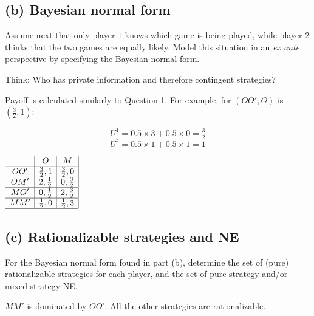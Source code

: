 \documentclass{article}
\begin{document}

\subsection*{(b) Bayesian normal form}

Assume next that only player $1$ knows which game is being played, while player $2$ thinks that
the two games are equally likely. Model this situation in an \textit{ex ante} perspective by specifying
the Bayesian normal form.

\smallskip

\begin{mdframed}[backgroundcolor=blue!20,linecolor=white]
Think: Who has private information and therefore contingent strategies?

\medskip

Payoff is calculated similarly to Question 1. For example, for $(OO',O)$ is $(\tfrac32,1)$:

$$U^1 = 0.5 \times 3 + 0.5 \times 0 = \tfrac32$$
$$U^2 = 0.5 \times 1 + 0.5 \times 1 = 1$$
\end{mdframed}


\begin{center}
$
\begin{array}{c|c|c|}
 & O & M \\
\hline
OO' & \tfrac32,1 & \tfrac32,0 \\
\hline
OM' & 2,\tfrac12 & 0,\tfrac32 \\
\hline
MO' & 0,\tfrac12 & 2,\tfrac32 \\
\hline
MM' & \tfrac12,0 & \tfrac12,3 \\
\hline
\end{array}
$
\end{center}
%


\subsection*{(c) Rationalizable strategies and NE}

For the Bayesian normal form found in part (b), determine the set of
(pure) rationalizable strategies for each player, and the set of pure-strategy and/or
mixed-strategy NE.

\bigskip

$MM'$ is dominated by $OO'$.
All the other strategies are rationalizable.
\end{document}
